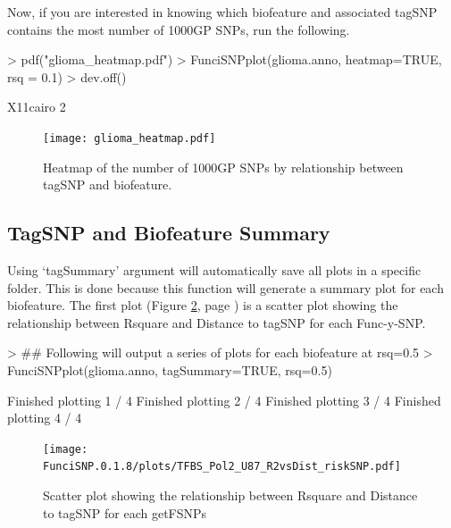 \documentclass[12pt,fullpage]{article}
\begin{document}
Now, if you are interested in knowing which biofeature and associated tagSNP
contains the most number of 1000GP SNPs, run the following.

\begin{Schunk}
\begin{Sinput}
> pdf("glioma_heatmap.pdf")
> FunciSNPplot(glioma.anno, heatmap=TRUE, rsq = 0.1)
> dev.off()
\end{Sinput}
\begin{Soutput}
X11cairo 
       2 
\end{Soutput}
\end{Schunk}

\begin{figure}[ht!]
\begin{center}
\texttt{[image: glioma\_heatmap.pdf]}
\caption{\label{fig:glioma_heatmap.pdf} Heatmap of the number of 1000GP SNPs by
    relationship between tagSNP and biofeature.}
{\footnotesize{}}
\end{center}
\end{figure}

\subsection{TagSNP and Biofeature Summary}

Using `tagSummary' argument will automatically save all plots in a specific
folder. This is done because this function will generate a summary plot for each
biofeature. The first plot (Figure \ref{fig:TFBS_Pol2_U87_R2vsDist_riskSNP.pdf},
        page \pageref{fig:TFBS_Pol2_U87_R2vsDist_riskSNP.pdf}) is a scatter plot
showing the relationship between Rsquare and Distance to tagSNP for each
Func-y-SNP.

\begin{Schunk}
\begin{Sinput}
> ## Following will output a series of plots for each biofeature at rsq=0.5
> FunciSNPplot(glioma.anno, tagSummary=TRUE, rsq=0.5)
\end{Sinput}
\begin{Soutput}
Finished plotting  1 / 4 
Finished plotting  2 / 4 
Finished plotting  3 / 4 
Finished plotting  4 / 4 
\end{Soutput}
\end{Schunk}

\begin{figure}[ht!]
\begin{center}
\texttt{[image: FunciSNP.0.1.8/plots/TFBS\_Pol2\_U87\_R2vsDist\_riskSNP.pdf]}
\caption{\label{fig:TFBS_Pol2_U87_R2vsDist_riskSNP.pdf} Scatter plot 
showing the relationship between Rsquare and Distance to tagSNP for each 
getFSNPs}
{\footnotesize{}}
\end{center}
\end{figure}
\end{document}
